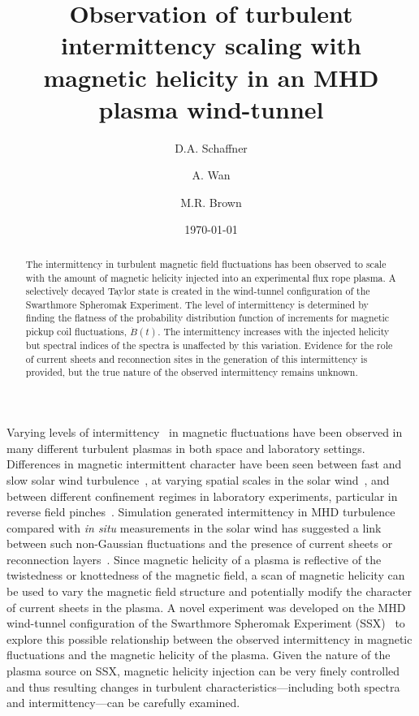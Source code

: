 \documentclass[aps,prl,amsmath,amssymb,reprint,superscriptaddress]{revtex4-1} %
\begin{document}
\title{Observation of turbulent intermittency scaling with magnetic helicity in an MHD plasma wind-tunnel}

\author{D.A. Schaffner}
\author{A. Wan}
\author{M.R. Brown}
\date{\today}
\begin{abstract}
The intermittency in turbulent magnetic field fluctuations has been observed to scale with the amount of magnetic helicity injected into an experimental flux rope plasma. A selectively decayed Taylor state is created in the wind-tunnel configuration of the Swarthmore Spheromak Experiment. The level of intermittency is determined by finding the flatness of the probability distribution function of increments for magnetic pickup coil fluctuations, $\dot{B}(t)$. The intermittency increases with the injected helicity but spectral indices of the spectra is unaffected by this variation. Evidence for the role of current sheets and reconnection sites in the generation of this intermittency is provided, but the true nature of the observed intermittency remains unknown.
\end{abstract}

\maketitle

Varying levels of intermittency~\cite{frisch95} in magnetic fluctuations have been observed in many different turbulent plasmas in both space and laboratory settings. Differences in magnetic intermittent character have been seen between fast and slow solar wind turbulence~\cite{sorrisovalvo99}, at varying spatial scales in the solar wind~\cite{wan12}, and between different confinement regimes in laboratory experiments, particular in reverse field pinches~\cite{sorrisovalvo01,marrelli05}. Simulation generated intermittency in MHD turbulence~\cite{Greco08,Greco09,Wan09,Servidio11b} compared with {\it in situ} measurements in the solar wind has suggested a link between such non-Gaussian fluctuations and the presence of current sheets or reconnection layers~\cite{veltri99,carbone90}. Since magnetic helicity of a plasma is reflective of the twistedness or knottedness of the magnetic field, a scan of magnetic helicity can be used to vary the magnetic field structure and potentially modify the character of current sheets in the plasma. A novel experiment was developed on the MHD wind-tunnel configuration of the Swarthmore Spheromak Experiment (SSX)~\cite{Gray13,schaffner14} to explore this possible relationship between the observed intermittency in magnetic fluctuations and the magnetic helicity of the plasma. Given the nature of the plasma source on SSX, magnetic helicity injection can be very finely controlled and thus resulting changes in turbulent characteristics---including both spectra and intermittency---can be carefully examined.
\end{document}

